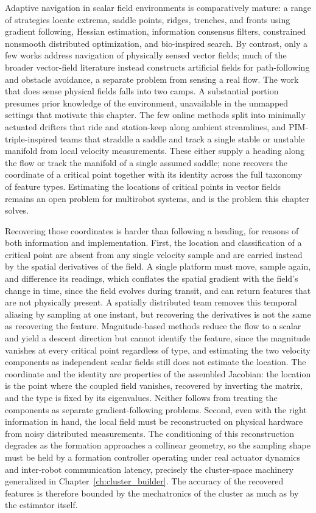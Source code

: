 \documentclass[12pt, letterpaper, oneside]{report}
\begin{document}
Adaptive navigation in scalar field environments is comparatively mature: a
range of strategies locate extrema, saddle points, ridges, trenches, and
fronts using gradient following, Hessian estimation, information consensus
filters, constrained nonsmooth distributed optimization, and bio-inspired
search. By contrast, only a few works address navigation of physically
sensed vector fields; much of the broader vector-field literature instead
constructs artificial fields for path-following and obstacle avoidance, a
separate problem from sensing a real flow. The work that does sense
physical fields falls into two camps. A substantial portion presumes prior
knowledge of the environment, unavailable in the unmapped settings that
motivate this chapter. The few online methods split into minimally actuated
drifters that ride and station-keep along ambient streamlines, and
PIM-triple-inspired teams that straddle a saddle and track a single stable
or unstable manifold from local velocity measurements. These either supply a
heading along the flow or track the manifold of a single assumed saddle;
none recovers the coordinate of a critical point together with its identity
across the full taxonomy of feature types. Estimating the locations of
critical points in vector fields remains an open problem for multirobot
systems, and is the problem this chapter solves.

Recovering those coordinates is harder than following a heading, for reasons
of both information and implementation. First, the location and
classification of a critical point are absent from any single velocity
sample and are carried instead by the spatial derivatives of the field. A
single platform must move, sample again, and difference its readings, which
conflates the spatial gradient with the field's change in time, since the
field evolves during transit, and can return features that are not
physically present. A spatially distributed team removes this temporal
aliasing by sampling at one instant, but recovering the derivatives is not
the same as recovering the feature. Magnitude-based methods reduce the flow
to a scalar and yield a descent direction but cannot identify the feature,
since the magnitude vanishes at every critical point regardless of type, and
estimating the two velocity components as independent scalar fields still
does not estimate the location. The coordinate and the identity are
properties of the assembled Jacobian: the location is the point where the
coupled field vanishes, recovered by inverting the matrix, and the type is
fixed by its eigenvalues. Neither follows from treating the components as
separate gradient-following problems. Second, even with the right
information in hand, the local field must be reconstructed on physical
hardware from noisy distributed measurements. The conditioning of this
reconstruction degrades as the formation approaches a collinear geometry, so
the sampling shape must be held by a formation controller operating under
real actuator dynamics and inter-robot communication latency, precisely the
cluster-space machinery generalized in Chapter~\ref{ch:cluster_builder}. The
accuracy of the recovered features is therefore bounded by the mechatronics
of the cluster as much as by the estimator itself.
\end{document}
